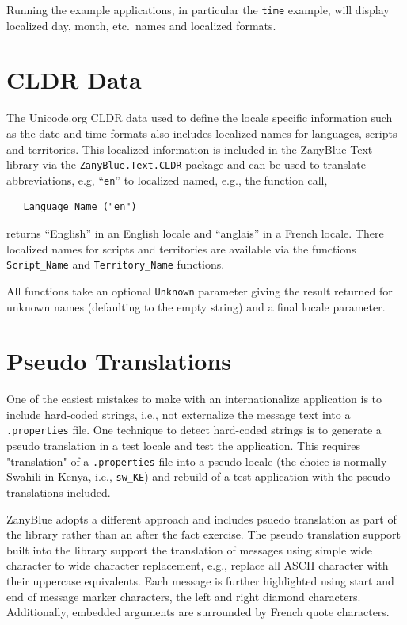 Running the example applications, in particular the \texttt{time} example,
will display localized day, month, etc.\ names and localized formats.

\section{CLDR Data}

The Unicode.org CLDR data used to define the locale specific information
such as the date and time formats also includes localized names for languages,
scripts and territories.  This localized information is included in the
ZanyBlue Text library via the \verb|ZanyBlue.Text.CLDR| package and can
be used to translate abbreviations, e.g, ``\texttt{en}'' to localized
named, e.g., the function call,
\begin{xmpl}
\begin{verbatim}
   Language_Name ("en")
\end{verbatim}
\end{xmpl}
returns ``English'' in an English locale and ``anglais'' in a French locale.
There localized names for scripts and territories are available via the functions
\verb|Script_Name| and \verb|Territory_Name| functions.

All functions take an optional \verb|Unknown| parameter giving the result
returned for unknown names (defaulting to the empty string) and a final
locale parameter.

\section{Pseudo Translations}
\label{sec_pseudo_translation}
\label{sec:pseudo-translation}

One of the easiest mistakes to make with an internationalize application is
to include hard-coded strings, i.e., not externalize the message text into
a \texttt{.properties} file.  One technique to detect hard-coded strings
is to generate a pseudo translation in a test locale and test the application.
This requires "translation" of a \texttt{.properties} file into a pseudo
locale (the choice is normally Swahili in Kenya, i.e., \verb|sw_KE|) and
rebuild of a test application with the pseudo translations included.

ZanyBlue adopts a different approach and includes psuedo translation as
part of the library rather than an after the fact exercise.  The pseudo
translation support built into the library support the translation of
messages using simple wide character to wide character replacement, e.g.,
replace all ASCII character with their uppercase equivalents.  Each message
is further highlighted using start and end of message marker characters,
the left and right diamond characters.  Additionally, embedded arguments
are surrounded by French quote characters.

